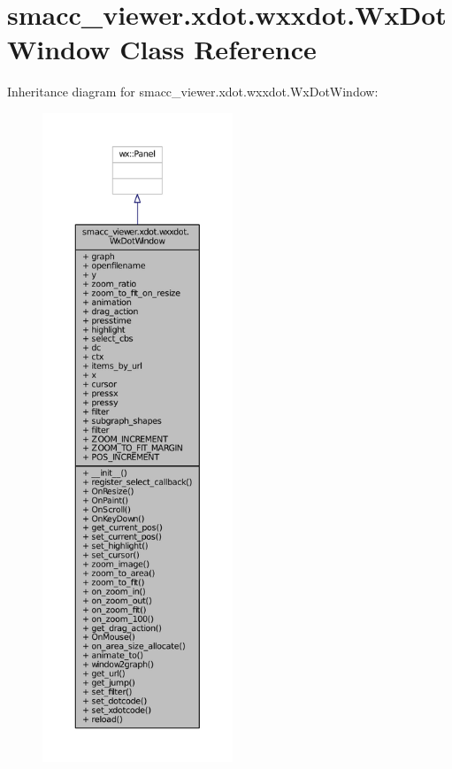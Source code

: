 \hypertarget{classsmacc__viewer_1_1xdot_1_1wxxdot_1_1WxDotWindow}{}\section{smacc\+\_\+viewer.\+xdot.\+wxxdot.\+Wx\+Dot\+Window Class Reference}
\label{classsmacc__viewer_1_1xdot_1_1wxxdot_1_1WxDotWindow}


Inheritance diagram for smacc\+\_\+viewer.\+xdot.\+wxxdot.\+Wx\+Dot\+Window\+:
\nopagebreak
\begin{figure}[H]
\begin{center}
\leavevmode
\includegraphics[height=550pt]{classsmacc__viewer_1_1xdot_1_1wxxdot_1_1WxDotWindow__inherit__graph}
\end{center}
\end{figure}


